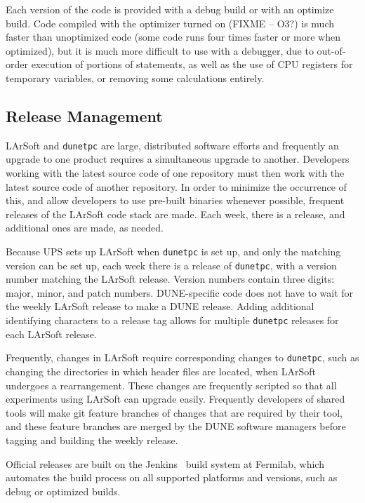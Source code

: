 Each version of the code is provided with a debug build or with an optimize build.  Code compiled with
the optimizer turned on (FIXME -- O3?) is much faster than unoptimized code (some code runs four times faster
or more when optimized), but it is much more difficult to use with a debugger, due to out-of-order execution
of portions of statements, as well as the use of CPU registers for temporary variables, or removing some
calculations entirely.

\subsection{Release Management}

LArSoft and {\tt dunetpc} are large, distributed software efforts and frequently an upgrade to one product
requires a simultaneous upgrade to another.  Developers working with the latest source code of one repository
must then work with the latest source code of another repository.  In order to minimize the occurrence of this,
and allow developers to use pre-built binaries whenever possible, frequent releases of the LArSoft code stack
are made.  Each week, there is a release, and additional ones are made, as needed.

Because UPS sets up LArSoft when {\tt dunetpc} is set up, and only the matching version can be set up,
each week there is a release of {\tt dunetpc}, with a version number matching the LArSoft release.  Version
numbers contain three digits: major, minor, and patch numbers.  DUNE-specific code does not have to wait
for the weekly LArSoft release to make a DUNE release.  Adding additional identifying characters to a release
tag allows for multiple {\tt dunetpc} releases for each LArSoft release.

Frequently, changes in LArSoft require corresponding changes to {\tt dunetpc}, such as changing the directories
in which header files are located, when LArSoft undergoes a rearrangement.  These changes are frequently scripted
so that all experiments using LArSoft can upgrade easily.  Frequently developers of shared tools will make git
feature branches of changes that are required by their tool, and these feature branches are merged by the
DUNE software managers before tagging and building the weekly release.

Official releases are built on the Jenkins~\cite{ref:jenkins} build system at Fermilab, which automates the
build process on all supported platforms and versions, such as debug or optimized builds.

